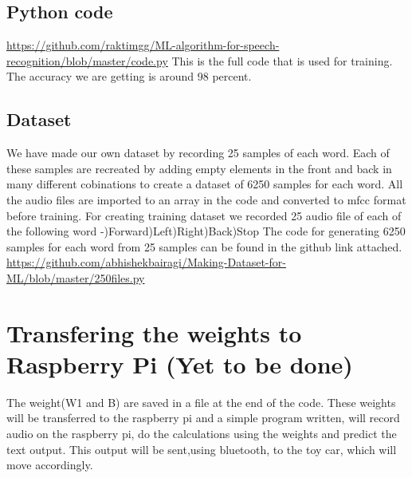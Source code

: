 \documentclass[journal,12pt,twocolumn]{IEEEtran}
\begin{document}
\subsection{Python code}

\url{https://github.com/raktimgg/ML-algorithm-for-speech-recognition/blob/master/code.py}\newline
This is the full code that is used for training. The accuracy we are getting is around 98 percent.

\subsection{Dataset}
We have made our own dataset by recording 25 samples of each word. Each of these samples are recreated by adding empty elements in the front and back in many different cobinations to create a dataset of 6250 samples for each word. All the audio files are imported to an array in the code and converted to mfcc format before training. For creating training dataset we recorded 25 audio file of each of the following word -)Forward)Left)Right)Back)Stop\newline
The code for generating 6250 samples for each word from 25 samples can be found in the github link attached.\newline
\url{https://github.com/abhishekbairagi/Making-Dataset-for-ML/blob/master/250files.py}



\section{Transfering the weights to Raspberry Pi (Yet to be done)}
The weight(W1 and B) are saved in a file at the end of the code. These weights will be transferred to the raspberry pi and a simple program written, will record audio on the raspberry pi, do the calculations using the weights and predict the text output. This output will be sent,using bluetooth, to the toy car, which will move accordingly.
\end{document}
